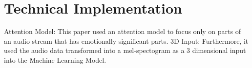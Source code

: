 \documentclass[11pt,a4paper]{scrbook}
\begin{document}
\section{Technical Implementation}
Attention Model: This paper used an attention model to focus only on parts of an audio stream that has emotionally significant parts.
3D-Input: Furthermore, it used the audio data transformed into a mel-spectogram as a 3 dimensional input into the Machine Learning Model. \cite{Chen:2018:3DConvRecurrentNN}
\newline\newline

\newpage

%

{\nocite{*}}
\end{document}
